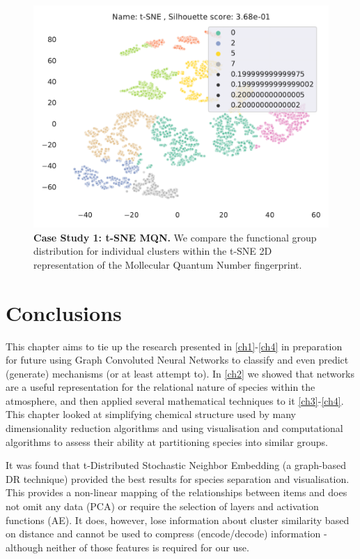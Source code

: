 \begin{figure}[H]
    \centering
    \includegraphics[width=\textwidth]{outputs/t-SNE/mqn_all.pdf}
    \caption{\textbf{Case Study 1: t-SNE MQN.} We compare the functional group distribution for individual clusters within the t-SNE 2D representation of the Mollecular Quantum Number fingerprint.}
    \label{fig:tsnemqncase}
\end{figure}
\newpage

\section{Conclusions}

This chapter aims to tie up the research presented in \autoref{ch1}-\ref{ch4} in preparation for future using Graph Convoluted Neural Networks \citep{gcn} to classify and even predict (generate) mechanisms (or at least attempt to). In \autoref{ch2} we showed that networks are a useful representation for the relational nature of species within the atmosphere, and then applied several mathematical techniques to it \autoref{ch3}-\ref{ch4}. This chapter looked at simplifying chemical structure used by many dimensionality reduction algorithms and using visualisation and computational algorithms to assess their ability at partitioning species into similar groups.

It was found that t-Distributed Stochastic Neighbor Embedding (a graph-based DR technique) provided the best results for species separation and visualisation. This provides a non-linear mapping of the relationships between items and does not omit any data (PCA) or require the selection of layers and activation functions (AE). It does, however, lose information about cluster similarity based on distance and cannot be used to compress (encode/decode) information - although neither of those features is required for our use.

